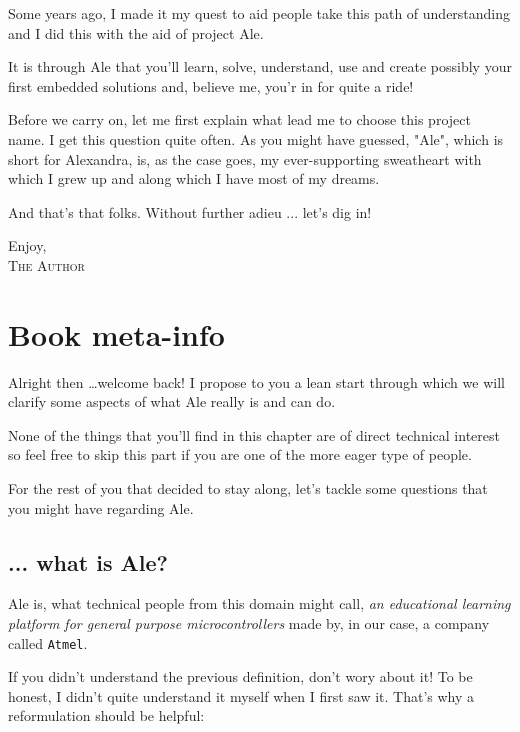 \documentclass[12pt, a4paper]{book}
\newcommand{\InsertBlankPage}{
  \newpage
  \null
  \thispagestyle{empty}
  \newpage
}
\begin{document}
Some years ago, I made it my quest to aid people take this path of understanding and I did this with the aid of project Ale. 

It is through Ale that you'll learn, solve,  understand, use and create possibly your first embedded solutions and, believe me, you'r in for quite a ride!

Before we carry on, let me first explain what lead me to choose this project name. I get this question quite often. As you might have guessed, "Ale", which is short for Alexandra, is, as the case goes, my ever-supporting sweatheart with which I grew up and along which I have most of my dreams.

And that's that folks. Without further adieu ... let's dig in!

\begin{minipage}{\textwidth}
  \begin{flushright}
    Enjoy,\\
    \textsc{The Author}
  \end{flushright}
\end{minipage}
\pagebreak
\InsertBlankPage

\setcounter{page}{1}
\tableofcontents{}
\chapter{Book meta-info}

Alright then \ldots welcome back! I propose to you a lean start through which we will clarify some aspects of what Ale really is and can do.

None of the things that you'll find in this chapter are of direct technical interest so feel free to skip this part if you are one of the more eager type of people.

For the rest of you that decided to stay along, let's tackle some questions that you might have regarding Ale. 

\section{ ... what is Ale?}

Ale is, what technical people from this domain might call, \textit{an educational learning platform for general purpose microcontrollers} made by, in our case, a company called \texttt{Atmel}.

If you didn't understand the previous definition, don't wory about it! To be honest, I didn't quite understand it myself when I first saw it. That's why a reformulation should be helpful:
\end{document}
